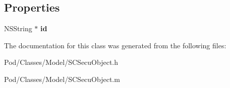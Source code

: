\subsection*{Properties}
\begin{DoxyCompactItemize}
\item 
N\+S\+String $\ast$ {\bfseries id}\hypertarget{interface_s_c_secu_object_ad4f5332ee77dcb0d535c0b5c4e9b3da4}{}\label{interface_s_c_secu_object_ad4f5332ee77dcb0d535c0b5c4e9b3da4}

\end{DoxyCompactItemize}


The documentation for this class was generated from the following files\+:\begin{DoxyCompactItemize}
\item 
Pod/\+Classes/\+Model/S\+C\+Secu\+Object.\+h\item 
Pod/\+Classes/\+Model/S\+C\+Secu\+Object.\+m\end{DoxyCompactItemize}
